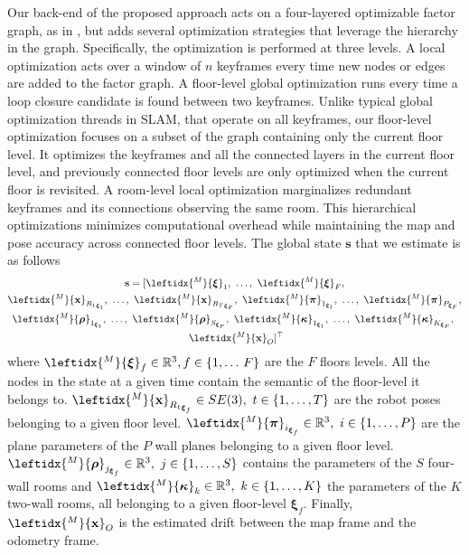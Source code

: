 Our back-end of the proposed approach acts on a four-layered optimizable factor graph, as in \cite{s_graphs+}, but adds several optimization strategies that leverage the hierarchy in the graph. Specifically, the optimization is performed at three levels. A local optimization acts over a window of $n$ keyframes every time new nodes or edges are added to the factor graph. A floor-level global optimization runs every time a loop closure candidate is found between two keyframes. Unlike typical global optimization threads in SLAM, that operate on all keyframes, our floor-level optimization focuses on a subset of the graph containing only the current floor level. It optimizes the keyframes and all the connected layers in the current floor level, and previously connected floor levels are only optimized when the current floor is revisited. A room-level local optimization marginalizes redundant keyframes and its connections observing the same room. This hierarchical optimizations minimizes computational overhead while maintaining the map and pose accuracy across connected floor levels. The global state $\mathbf{s}$ that we estimate is as follows
%
\begin{multline}
\mathbf{s} = [
\leftidx{^M}{\boldsymbol{\xi}}_{{1}}, \ \hdots, \ \leftidx{^M}{\boldsymbol{\xi}}_{F}, \\ 
\leftidx{^M}{\mathbf{x}}_{{R_1}_{\boldsymbol{\xi}_1}}, \ \hdots, \ \leftidx{^M}{\mathbf{x}}_{{R_T}_{\boldsymbol{\xi}_F}}, \ \leftidx{^M}{\boldsymbol{\pi}}_{{1}_{\boldsymbol{\xi}_1}}, \ \hdots, \ \leftidx{^M}{\boldsymbol{\pi}}_{{P}_{\boldsymbol{\xi}_F}}, \\
\leftidx{^M}{\boldsymbol{\rho}}_{{1}_{\boldsymbol{\xi}_1}}, \ \hdots, \ \leftidx{^M}{\boldsymbol{\rho}}_{{S}_{\boldsymbol{\xi}_F}}, \ \leftidx{^M}{\boldsymbol{\kappa}}_{{1}_{\boldsymbol{\xi}_1}}, \ \hdots, \  \leftidx{^M}{\boldsymbol{\kappa}}_{{K}_{\boldsymbol{\xi}_F}}, \ \\  \ \leftidx{^M}{\mathbf{x}}_{O}]^\top
\end{multline}
%
where $\leftidx{^M}{\boldsymbol{\xi}}_{f} \in \mathbb{R}^3, f \in \{1, \hdots \, F \}$ are the $F$ floors levels. All the nodes in the state at a given time contain the semantic of the floor-level it belongs to. $\leftidx{^M}{\mathbf{x}}_{{R_t}_{\boldsymbol{\xi}_f}} \in SE(3), \ t \in \{1, \hdots, T\}$ are the robot poses belonging to a given floor level. $\leftidx{^M}{\boldsymbol{\pi}}_{{i}_{\boldsymbol{\xi}_f}} \in \mathbb{R}^3, \ i \in \{1, \hdots, P\}$ are the plane parameters of the $P$ wall planes belonging to a given floor level. $\leftidx{^M}{\boldsymbol{\rho}}_{{j}_{\boldsymbol{\xi}_f}} \in \mathbb{R}^3, \ j \in \{1, \hdots, S\}$ contains the parameters of the $S$ four-wall rooms and $\leftidx{^M}{\boldsymbol{\kappa}}_{k} \in \mathbb{R}^3, \ k \in \{1, \hdots, K\}$ the parameters of the $K$ two-wall rooms, all belonging to a given floor-level ${\boldsymbol{\xi}_f}$. Finally, $\leftidx{^M}{\mathbf{x}}_{O}$ is the estimated drift between the map frame and the odometry frame. 


